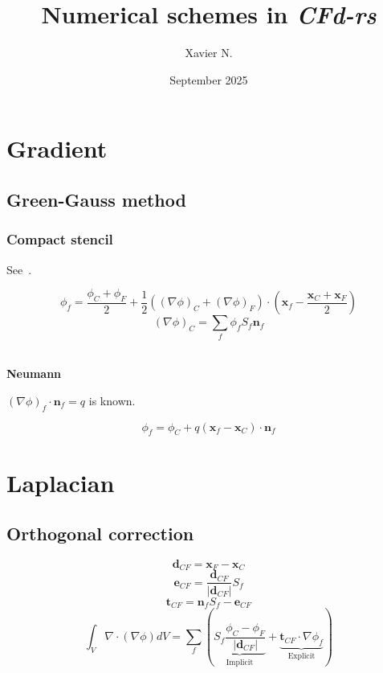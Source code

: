 \documentclass{article}
\title{Numerical schemes in \textit{CFd-rs}}
\author{
    Xavier N.\\
}
\date{September 2025}
\begin{document}
\maketitle

\section{Gradient}
    
    \subsection{Green-Gauss method}
        
        \subsubsection{Compact stencil}
            
            See~\cite[p.~278]{fvm-basics}.
            
            \[\phi_f = \frac{\phi_C + \phi_F}{2} + \frac{1}{2}((\nabla \phi)_C + (\nabla \phi)_F) \cdot (\mathbf{x}_f - \frac{\mathbf{x}_C + \mathbf{x}_F}{2})\]
            \[(\nabla \phi)_C = \sum_f \phi_f S_f \mathbf{n}_f \]
            
            ~\\
            
            \textbf{Neumann}
                
                $(\nabla \phi)_f \cdot \mathbf{n}_f = q$ is known. 
                
                \[\phi_f = \phi_C + q (\mathbf{x}_f - \mathbf{x}_C) \cdot \mathbf{n}_f\]
    
\section{Laplacian}
    
    \subsection{Orthogonal correction}
        
        \[\mathbf{d}_{CF} = \mathbf{x}_F - \mathbf{x}_C\]
        \[\mathbf{e}_{CF} = \frac{\mathbf{d}_{CF}}{|\mathbf{d}_{CF}|} S_f\]
        \[\mathbf{t}_{CF} = \mathbf{n}_f S_f - \mathbf{e}_{CF}\]
        \[\int_V \nabla \cdot (\nabla \phi) dV = \sum_f ( \underbrace{S_f \frac{\phi_C - \phi_F}{|\mathbf{d}_{CF}|}}_\text{Implicit} + \underbrace{\mathbf{t}_{CF} \cdot \nabla \phi_f}_\text{Explicit} ) \]
    
\end{document}
